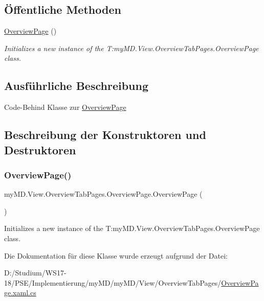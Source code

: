 \subsection*{Öffentliche Methoden}
\begin{DoxyCompactItemize}
\item 
\mbox{\hyperlink{classmy_m_d_1_1_view_1_1_overview_tab_pages_1_1_overview_page_a42d690c280c75084ebfeb81628352f8e}{Overview\+Page}} ()
\begin{DoxyCompactList}\small\item\em Initializes a new instance of the T\+:my\+M\+D.\+View.\+Overview\+Tab\+Pages.\+Overview\+Page class. \end{DoxyCompactList}\end{DoxyCompactItemize}


\subsection{Ausführliche Beschreibung}
Code-\/\+Behind Klasse zur \mbox{\hyperlink{classmy_m_d_1_1_view_1_1_overview_tab_pages_1_1_overview_page}{Overview\+Page}} 



\subsection{Beschreibung der Konstruktoren und Destruktoren}
\mbox{\label{classmy_m_d_1_1_view_1_1_overview_tab_pages_1_1_overview_page_a42d690c280c75084ebfeb81628352f8e}} 
\subsubsection{\texorpdfstring{Overview\+Page()}{OverviewPage()}}
{\footnotesize\ttfamily my\+M\+D.\+View.\+Overview\+Tab\+Pages.\+Overview\+Page.\+Overview\+Page (\begin{DoxyParamCaption}{ }\end{DoxyParamCaption})}



Initializes a new instance of the T\+:my\+M\+D.\+View.\+Overview\+Tab\+Pages.\+Overview\+Page class. 



Die Dokumentation für diese Klasse wurde erzeugt aufgrund der Datei\+:\begin{DoxyCompactItemize}
\item 
D\+:/\+Studium/\+W\+S17-\/18/\+P\+S\+E/\+Implementierung/my\+M\+D/my\+M\+D/\+View/\+Overview\+Tab\+Pages/\mbox{\hyperlink{_overview_page_8xaml_8cs}{Overview\+Page.\+xaml.\+cs}}\end{DoxyCompactItemize}

